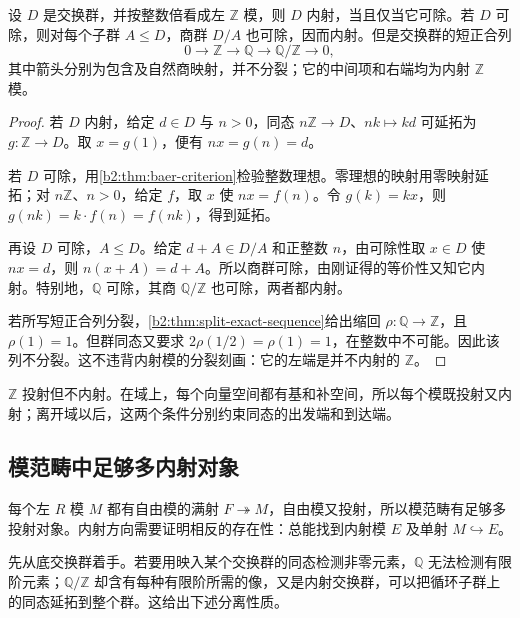 \begin{theorem}\label{b2:thm:divisible-injective}
	设 \(D\) 是交换群，并按整数倍看成左 \(\mathbb Z\) 模，则 \(D\) 内射，当且仅当它可除。若 \(D\) 可除，则对每个子群 \(A\leq D\)，商群 \(D/A\) 也可除，因而内射。但是交换群的短正合列
	\[
		0\longrightarrow\mathbb Z\longrightarrow\mathbb Q \longrightarrow\mathbb Q/\mathbb Z\longrightarrow0,
	\]
	其中箭头分别为包含及自然商映射，并不分裂；它的中间项和右端均为内射 \(\mathbb Z\) 模。
\end{theorem}
\begin{proof}
	若 \(D\) 内射，给定 \(d\in D\) 与 \(n>0\)，同态 \(n\mathbb Z\to D\)、\(nk\mapsto kd\) 可延拓为 \(g:\mathbb Z\to D\)。取 \(x=g(1)\)，便有 \(nx=g(n)=d\)。

	若 \(D\) 可除，用\cref{b2:thm:baer-criterion}检验整数理想。零理想的映射用零映射延拓；对 \(n\mathbb Z\)、\(n>0\)，给定 \(f\)，取 \(x\) 使 \(nx=f(n)\)。令 \(g(k)=kx\)，则 \(g(nk)=k\cdot f(n)=f(nk)\)，得到延拓。

	再设 \(D\) 可除，\(A\leq D\)。给定 \(d+A\in D/A\) 和正整数 \(n\)，由可除性取 \(x\in D\) 使 \(nx=d\)，则 \(n(x+A)=d+A\)。所以商群可除，由刚证得的等价性又知它内射。特别地，\(\mathbb Q\) 可除，其商 \(\mathbb Q/\mathbb Z\) 也可除，两者都内射。

	若所写短正合列分裂，\cref{b2:thm:split-exact-sequence}给出缩回 \(\rho:\mathbb Q\to\mathbb Z\)，且 \(\rho(1)=1\)。但群同态又要求 \(2\rho(1/2)=\rho(1)=1\)，在整数中不可能。因此该列不分裂。这不违背内射模的分裂刻画：它的左端是并不内射的 \(\mathbb Z\)。
\end{proof}

\(\mathbb Z\) 投射但不内射。在域上，每个向量空间都有基和补空间，所以每个模既投射又内射；离开域以后，这两个条件分别约束同态的出发端和到达端。

\subsection{模范畴中足够多内射对象}
\label{b2:subsec:0702:03}

每个左 \(R\) 模 \(M\) 都有自由模的满射 \(F\twoheadrightarrow M\)，自由模又投射，所以模范畴有足够多投射对象。内射方向需要证明相反的存在性：总能找到内射模 \(E\) 及单射 \(M\hookrightarrow E\)。

\ProseParagraphBreak
先从底交换群着手。若要用映入某个交换群的同态检测非零元素，\(\mathbb Q\) 无法检测有限阶元素；\(\mathbb Q/\mathbb Z\) 却含有每种有限阶所需的像，又是内射交换群，可以把循环子群上的同态延拓到整个群。这给出下述分离性质。

